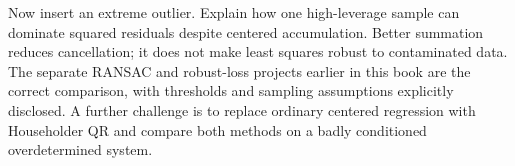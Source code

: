 \begin{booktwopitfall}
Now insert an extreme outlier. Explain how one high-leverage sample
can dominate squared residuals despite centered accumulation. Better
summation reduces cancellation; it does not make least squares robust
to contaminated data. The separate RANSAC and robust-loss projects
earlier in this book are the correct comparison, with thresholds and
sampling assumptions explicitly disclosed. A further challenge is to
replace ordinary centered regression with Householder QR and compare
both methods on a badly conditioned overdetermined system.

\end{booktwopitfall}
